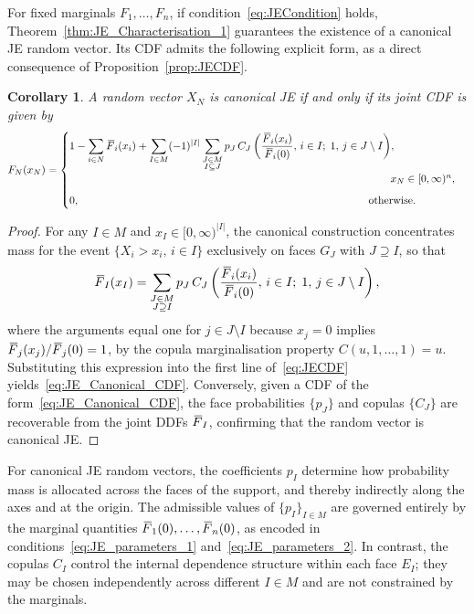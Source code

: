 \documentclass[letterpaper,12pt]{article}
\numberwithin{equation}{section}
\newtheorem{corollary}[theorem]{Corollary}
\newcommand{\N}{{N}}
\newcommand{\M}{{M}}
\newcommand{\J}{{J}}
\newcommand{\I}{{I}}
\newcommand{\F}{\,\overline{\kern-0.175em F\kern-0em}}
\begin{document}
{For fixed marginals $F_1,\dots,F_n$, if condition~\eqref{eq:JECondition} holds,
Theorem~\ref{thm:JE_Characterisation_1} guarantees the existence of a canonical JE
random vector. Its CDF admits the following explicit form, as a direct consequence
of Proposition~\ref{prop:JECDF}.

\begin{corollary}
\label{cor:JE_Canonical_CDF_phi}
A random vector $X_{\N}$ is canonical JE if and only if its joint CDF is given by
\begin{equation}
\label{eq:JE_Canonical_CDF}
F_{\N}(x_{\N})=\begin{cases}
{\displaystyle
1-\sum_{i\in\N}\F_i(x_i)
+\sum_{\I\in\M}(-1)^{|\I|}
\sum_{\substack{\J\in\M\\ \I\subseteq \J}}
p_{\J}\,C_{\J}\left(\frac{\F_i(x_i)}{\F_i(0)},\,i\in\I;\;1,\,j\in \J\setminus \I\right)},
\\[10pt]
\hspace{10.5cm} x_{\N}\in[0,\infty)^n, \\[6pt]
0, \hspace{9.45cm} \text{otherwise.}
\end{cases}
\end{equation}
\end{corollary}

\begin{proof}
For any $\I\in\M$ and $x_\I\in[0,\infty)^{|\I|}$, the canonical construction
concentrates mass for the event $\{X_i>x_i,\,i\in\I\}$ exclusively on faces
$G_\J$ with $\J\supseteq\I$, so that
\[
\F_\I(x_\I)
=\sum_{\substack{\J\in\M\\\J\supseteq\I}}
p_\J\,C_\J\left(\frac{\F_i(x_i)}{\F_i(0)},\,i\in\I;\;1,\,j\in\J\setminus\I\right),
\]
where the arguments equal one for $j\in\J\setminus\I$ because $x_j=0$ implies
$\F_j(x_j)/\F_j(0)=1$, by the copula marginalisation property
$C(u,1,\dots,1)=u$. Substituting this expression into the first line
of~\eqref{eq:JECDF} yields~\eqref{eq:JE_Canonical_CDF}. Conversely, given a CDF
of the form~\eqref{eq:JE_Canonical_CDF}, the face probabilities $\{p_\J\}$ and
copulas $\{C_\J\}$ are recoverable from the joint DDFs $\F_\I$, confirming that
the random vector is canonical JE.
\end{proof}

For canonical JE random vectors, the coefficients $p_{\I}$ determine how
probability mass is allocated across the faces of the support, and thereby
indirectly along the axes and at the origin. The admissible values of
$\{p_\I\}_{\I\in\M}$ are governed entirely by the marginal
quantities $\F_1(0),\dots,\F_n(0)$, as encoded in
conditions~\eqref{eq:JE_parameters_1} and~\eqref{eq:JE_parameters_2}. In contrast,
the copulas $C_{\I}$ control the internal dependence structure within each face
$E_{\I}$; they may be chosen independently across different $\I\in\M$ and are not
constrained by the marginals.

}
\end{document}
